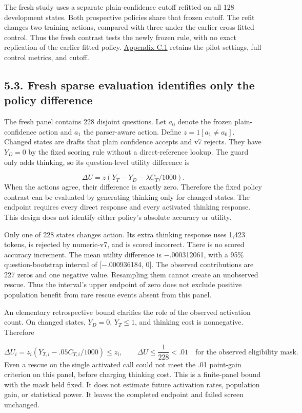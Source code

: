 \documentclass[11pt,a4paper]{article}
\begin{document}
The fresh study uses a separate plain-confidence cutoff refitted on all 128 development states. Both prospective policies share that frozen cutoff. The refit changes two training actions, compared with three under the earlier cross-fitted control. Thus the fresh contrast tests the newly frozen rule, with no exact replication of the earlier fitted policy. \hyperref[sec:c1-development-pilot-and-guard-refit]{Appendix C.1} retains the pilot settings, full control metrics, and cutoff.

\subsection*{5.3. Fresh sparse evaluation identifies only the policy difference}\label{sec:53-fresh-sparse-evaluation-identifies-only-the-policy-difference}
The fresh panel contains 228 disjoint questions. Let \(a_0\) denote the frozen plain-confidence action and \(a_1\) the parser-aware action. Define \(z=1[a_1\ne a_0]\). Changed states are drafts that plain confidence accepts and v7 rejects. They have \(Y_D=0\) by the fixed scoring rule without a direct-reference lookup. The guard only adds thinking, so its question-level utility difference is

\[
\Delta U=z(Y_T-Y_D-\lambda C_T/1000).
\]
When the actions agree, their difference is exactly zero. Therefore the fixed policy contrast can be evaluated by generating thinking only for changed states. The endpoint requires every direct response and every activated thinking response. This design does not identify either policy's absolute accuracy or utility.

Only one of 228 states changes action. Its extra thinking response uses 1,423 tokens, is rejected by numeric-v7, and is scored incorrect. There is no scored accuracy increment. The mean utility difference is \ensuremath{-}.000312061, with a 95\% question-bootstrap interval of [\ensuremath{-}.000936184, 0]. The observed contributions are 227 zeros and one negative value. Resampling them cannot create an unobserved rescue. Thus the interval's upper endpoint of zero does not exclude positive population benefit from rare rescue events absent from this panel.

An elementary retrospective bound clarifies the role of the observed activation count. On changed states, \(Y_D=0\), \(Y_T\le1\), and thinking cost is nonnegative. Therefore

\[
\Delta U_i=z_i(Y_{T,i}-.05C_{T,i}/1000)\le z_i,
\qquad
\overline{\Delta U}\le\frac{1}{228}<.01
\quad\text{for the observed eligibility mask}.
\]
Even a rescue on the single activated call could not meet the .01 point-gain criterion on this panel, before charging thinking cost. This is a finite-panel bound with the mask held fixed. It does not estimate future activation rates, population gain, or statistical power. It leaves the completed endpoint and failed screen unchanged.
\end{document}
